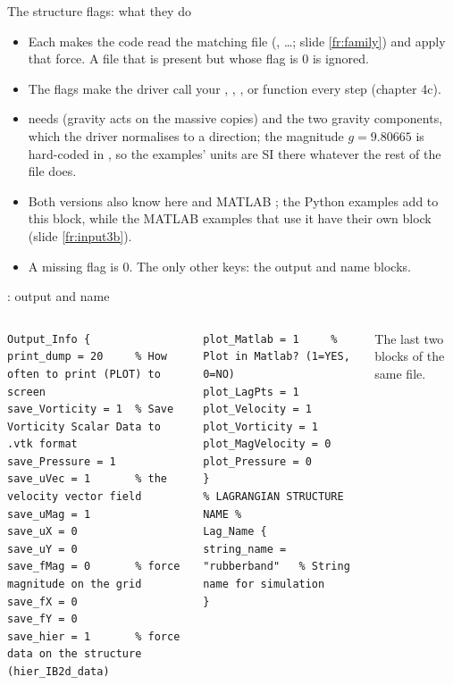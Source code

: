 \documentclass[aspectratio=169,11pt]{beamer}
\begin{document}
\begin{frame}{The structure flags: what they do}
\label{fr:input2b}
\small
\begin{itemize}
  \item Each  makes the code read the matching file (, \ldots; slide \ref{fr:family}) and apply that force. A file that is present but whose flag is 0 is ignored.
  \item The  flags make the driver call your , , ,  or  function every step (chapter 4c).
  \item {} needs  (gravity acts on the massive copies) and the two gravity components, which the driver normalises to a direction; the magnitude $g = 9.80665$ is hard-coded in , so the examples' units are SI there whatever the rest of the file does.
  \item Both versions also know  here and MATLAB ; the Python examples add  to this block, while the MATLAB examples that use it have their own block (slide \ref{fr:input3b}).
  \item A missing flag is 0. The only other keys: the output and name blocks.
\end{itemize}
\end{frame}

\begin{frame}[fragile]{: output and name}
\label{fr:input3}
\begin{columns}[T]
\begin{lstlisting}[style=input]
% PRINTING INFORMATION
Output_Info {
print_dump = 20     % How often to print (PLOT) to screen
save_Vorticity = 1  % Save Vorticity Scalar Data to .vtk format
save_Pressure = 1
save_uVec = 1       % the velocity vector field
save_uMag = 1
save_uX = 0
save_uY = 0
save_fMag = 0       % force magnitude on the grid
save_fX = 0
save_fY = 0
save_hier = 1       % force data on the structure (hier_IB2d_data)
\end{lstlisting}
\begin{lstlisting}[style=input]
plot_Matlab = 1     % Plot in Matlab? (1=YES, 0=NO)
plot_LagPts = 1
plot_Velocity = 1
plot_Vorticity = 1
plot_MagVelocity = 0
plot_Pressure = 0
}
% LAGRANGIAN STRUCTURE NAME %
Lag_Name {
string_name = "rubberband"   % String name for simulation
}
\end{lstlisting}
\small The last two blocks of the same file.
\end{columns}
\end{frame}
\end{document}
